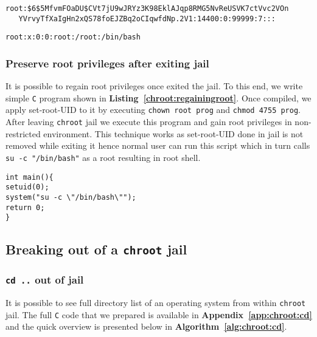 \documentclass[12pt, a4paper, pdflatex]{article}
\begin{document}
\vspace{1em}
\begin{lstlisting}
root:$6$5MfvmFOaDU$CVt7jU9wJRYz3K98EklAJqp8RMG5NvReUSVK7ctVvc2VOn
   YVrvyTfXaIgHn2xQS78foEJZBq2oCIqwfdNp.2V1:14400:0:99999:7:::
\end{lstlisting}
\vspace{1em}
\begin{lstlisting}
root:x:0:0:root:/root:/bin/bash
\end{lstlisting}

\subsubsection{Preserve root privileges after exiting jail}
It is possible to regain root privileges once exited the jail. To this end, we write simple \texttt{C} program shown in \textbf{Listing~\ref{chroot:regainingroot}}. Once compiled, we apply set-root-UID to it by executing \texttt{chown root prog} and \texttt{chmod 4755 prog}.\\
After leaving \texttt{chroot} jail we execute this program and gain root privileges in non-restricted environment. This technique works as set-root-UID done in jail is not removed while exiting it hence normal user can run this script which in turn calls \texttt{su -c "/bin/bash"} as a root resulting in root shell.

\vspace{1em}
\begin{lstlisting}
int main(){
setuid(0);
system("su -c \"/bin/bash\"");
return 0;
}
\end{lstlisting}

\subsection{Breaking out of a \texttt{chroot} jail}
\subsubsection{\texttt{cd ..} out of jail}
It is possible to see full directory list of an operating system from within \texttt{chroot} jail. The full \texttt{C} code that we prepared is available in \textbf{Appendix~\ref{app:chroot:cd}} and the quick overview is presented below in \textbf{Algorithm~\ref{alg:chroot:cd}}.
\end{document}

